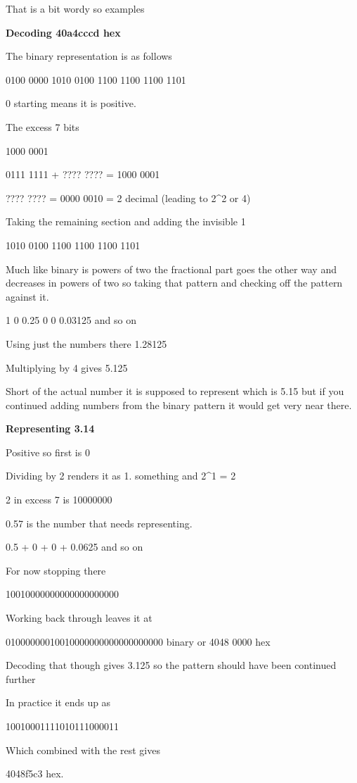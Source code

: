 \documentclass[
]{book}
\begin{document}
That is a bit wordy so examples

\textbf{Decoding 40a4cccd hex}

The binary representation is as follows

0100 0000 1010 0100 1100 1100 1100 1101

0 starting means it is positive.

The excess 7 bits

1000 0001

0111 1111 + ???? ???? = 1000 0001

???? ???? = 0000 0010 = 2 decimal (leading to 2\^{}2 or 4)

Taking the remaining section and adding the invisible 1

1010 0100 1100 1100 1100 1101

Much like binary is powers of two the fractional part goes the other way and decreases in powers of two so taking that pattern and checking off the pattern against it.

1 0 0.25 0 0 0.03125 and so on

Using just the numbers there 1.28125

Multiplying by 4 gives 5.125

Short of the actual number it is supposed to represent which is 5.15 but if you continued adding numbers from the binary pattern it would get very near there.

\textbf{Representing 3.14}

Positive so first is 0

Dividing by 2 renders it as 1. something and 2\^{}1 = 2

2 in excess 7 is 10000000

0.57 is the number that needs representing.

0.5 + 0 + 0 + 0.0625 and so on

For now stopping there

10010000000000000000000

Working back through leaves it at

01000000010010000000000000000000 binary or 4048 0000 hex

Decoding that though gives 3.125 so the pattern should have been continued further

In practice it ends up as

10010001111010111000011

Which combined with the rest gives

4048f5c3 hex.
\end{document}
